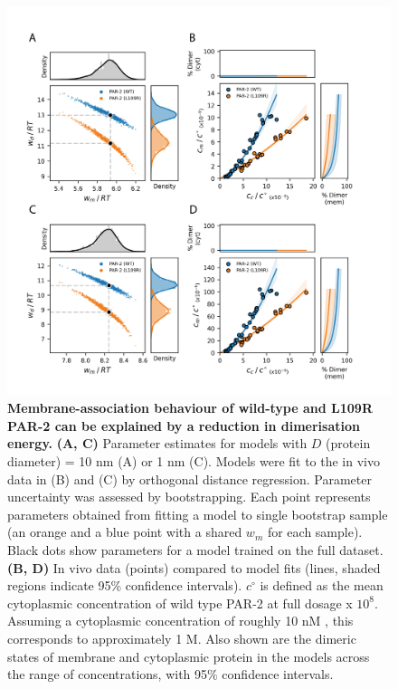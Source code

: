 \documentclass[12pt]{"report"}
\newcommand{\mycaption}[2]{\caption[#1]{\textbf{#1.} #2}}
\begin{document}
\begin{figure}
\includegraphics[scale=0.85]{thermodynamic_wt_vs_l109r_model_fit}
\centering
\mycaption{Membrane-association behaviour of wild-type and L109R PAR-2 can be explained by a reduction in dimerisation energy}{
\textbf{(A, C)} Parameter estimates for models with $D$ (protein diameter) = 10 nm (A) or 1 nm (C). Models were fit to the in vivo data in (B) and (C) by orthogonal distance regression. Parameter uncertainty was assessed by bootstrapping. Each point represents parameters obtained from fitting a model to single bootstrap sample (an orange and a blue point with a shared $w_m$ for each sample). Black dots show parameters for a model trained on the full dataset.
\textbf{(B, D)} In vivo data (points) compared to model fits (lines, shaded regions indicate 95\% confidence intervals). $c^{\circ}$ is defined as the mean cytoplasmic concentration of wild type PAR-2 at full dosage x $10^8$. Assuming a cytoplasmic concentration of roughly 10 nM \citep{Gross2018}, this corresponds to approximately 1 M. Also shown are the dimeric states of membrane and cytoplasmic protein in the models across the range of concentrations, with 95\% confidence intervals.
}
\label{fig:thermodynamic_wt_vs_l109r_model_fit}
\end{figure}
\end{document}
